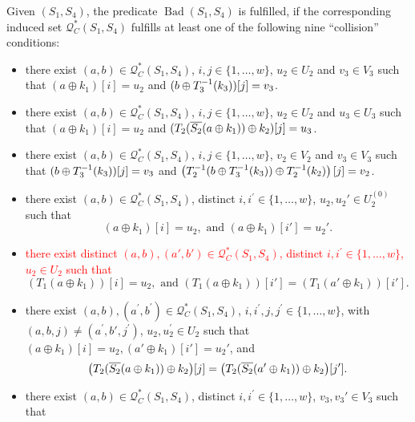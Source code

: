 \begin{definition}
	\label{defn:bad-outer-4-rounds}
	
	Given $(S_1, S_4)$, the predicate $\operatorname{Bad}\left(S_{1},S_{4}\right)$ is fulfilled, if the corresponding induced set $\mathcal{Q}_{C}^{*}\left(S_{1}, S_{4}\right)$ fulfills at least one of the following nine ``collision'' conditions:
	\begin{itemize}
		\item[\cone]
		there exist $(a, b) \in \mathcal{Q}_{C}^{*}\left(S_{1}, S_{4}\right)$, $i, j \in\{1, \ldots, w\}$, $u_{2} \in U_{2}$ and $v_{3} \in V_{3}$ such that $(a \oplus k_1)[i] = u_2$ and $(b\oplus T_{3}^{-1}(k_3))[j] = v_3$.
		\item[\ctwo]
		there exist $(a, b) \in \mathcal{Q}_{C}^{*}\left(S_{1}, S_{4}\right)$, $i, j \in\{1, \ldots, w\}$, $u_{2} \in U_{2}$ and $u_{3} \in U_{3}$ such that $(a \oplus k_1)[i] = u_2$ and $(T_{2}(\overline{S_2}(a \oplus k_1))\oplus k_2)[j] = u_3$.
		\item[\cthree]
		there exist $(a, b) \in \mathcal{Q}_{C}^{*}\left(S_{1}, S_{4}\right)$, $i, j \in\{1, \ldots, w\}$, $v_{2} \in V_{2}$ and $v_{3} \in V_{3}$ such that $(b\oplus T_{3}^{-1}(k_3))[j] = v_3$ and $\left(T_{2}^{-1}(b\oplus T_{3}^{-1}(k_3)) \oplus T_{2}^{-1}(k_2)\right)[j] = v_2$.
		\item[\cfour]
		there exist $(a, b) \in \mathcal{Q}_{C}^{*}\left(S_{1}, S_{4}\right)$, distinct $i, i^{\prime}\in\{1, \ldots, w\}$, $u_{2},u_{2}' \in U_{2}^{(0)}$ such that
		$$(a \oplus k_1)[i] = u_2,\text{ and }
		(a \oplus k_1)[i'] = u_2'.$$
		\item[\cfive] \textcolor{red}{there exist distinct $(a, b),(a',b') \in \mathcal{Q}_{C}^{*}\left(S_{1}, S_{4}\right)$, distinct $i, i^{\prime}\in\{1, \ldots, w\}$, $u_{2} \in U_{2}$ such that}
		$$\left(T_1\left(a \oplus k_{1}\right)\right)[i] = u_2,\text{ and }
		\left(T_1\left(a \oplus k_{1}\right)\right)[i'] = \left(T_1\left(a' \oplus k_{1}\right)\right)[i'].$$
		\item[\csix]
		there exist $(a, b), (a^{\prime}, b^{\prime}) \in \mathcal{Q}_{C}^{*}\left(S_{1}, S_{4}\right)$, $i, i^{\prime},j, j^{\prime} \in\{1, \ldots, w\}$, with $(a,b, j) \neq \left(a^{\prime}, b',j^{\prime}\right)$, $u_{2}, u_{2}^{\prime} \in U_{2}$ such that $(a \oplus k_1)[i] = u_2, (a' \oplus k_1)[i'] = u_2'$, and
		$$\big(T_2(\overline{S_2}(a\oplus k_1))\oplus k_2\big)[j]=\big(T_2(\overline{S_2}(a'\oplus k_1))\oplus k_2\big)[j'].
		$$
		\item[\cseven]
		there exist $(a, b) \in \mathcal{Q}_{C}^{*}\left(S_{1}, S_{4}\right)$, distinct $i, i^{\prime}\in\{1, \ldots, w\}$, $v_{3},v_{3}' \in V_{3}$ such that

\end{itemize}
\end{definition}
